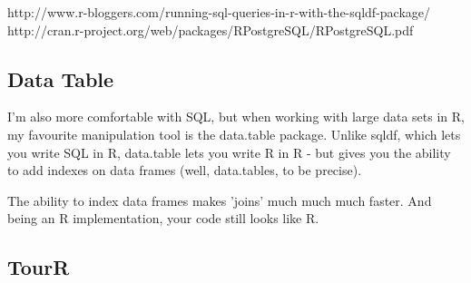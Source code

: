 http://www.r-bloggers.com/running-sql-queries-in-r-with-the-sqldf-package/
http://cran.r-project.org/web/packages/RPostgreSQL/RPostgreSQL.pdf

\subsection{Data Table}
I'm also more comfortable with SQL, but when working with large data sets in R, 
my favourite manipulation tool is the data.table package. 
Unlike sqldf, which lets you write SQL in R, data.table lets you write R 
in R - but gives you the ability to add indexes on data frames 
(well, data.tables, to be precise). 

The ability to index data frames makes 'joins' much much much faster. 
And being an R implementation, your code still looks like R.

\subsection{TourR}
